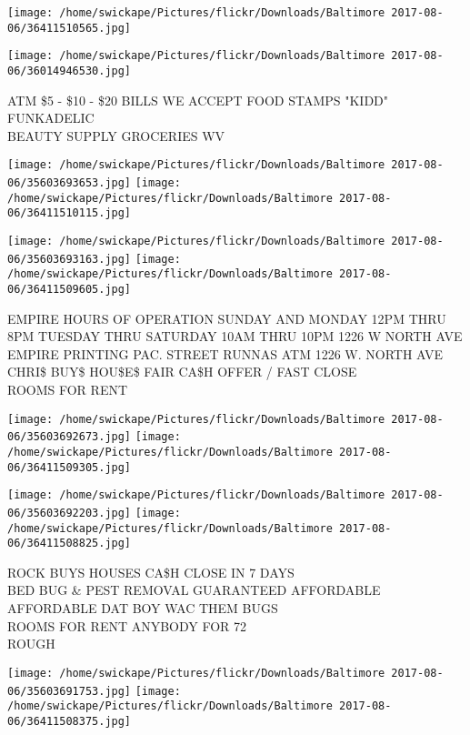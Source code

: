 \documentclass[10pt,letterpaper]{article}
\begin{document}
\texttt{[image: /home/swickape/Pictures/flickr/Downloads/Baltimore 2017-08-06/36411510565.jpg]}

\vspace{0.25in}
\texttt{[image: /home/swickape/Pictures/flickr/Downloads/Baltimore 2017-08-06/36014946530.jpg]}

ATM \$5 {-} \$10 {-} \$20 BILLS WE ACCEPT FOOD STAMPS "KIDD" FUNKADELIC\\
BEAUTY SUPPLY GROCERIES WV\\
\pagebreak

\texttt{[image: /home/swickape/Pictures/flickr/Downloads/Baltimore 2017-08-06/35603693653.jpg]}
\texttt{[image: /home/swickape/Pictures/flickr/Downloads/Baltimore 2017-08-06/36411510115.jpg]}

\texttt{[image: /home/swickape/Pictures/flickr/Downloads/Baltimore 2017-08-06/35603693163.jpg]}
\texttt{[image: /home/swickape/Pictures/flickr/Downloads/Baltimore 2017-08-06/36411509605.jpg]}

EMPIRE HOURS OF OPERATION SUNDAY AND MONDAY 12PM THRU 8PM TUESDAY THRU SATURDAY 10AM THRU 10PM 1226 W NORTH AVE\\
EMPIRE PRINTING PAC. STREET RUNNAS ATM 1226 W. NORTH AVE\\
CHRI\$ BUY\$ HOU\$E\$ FAIR CA\$H OFFER / FAST CLOSE\\
ROOMS FOR RENT\\
\pagebreak

\texttt{[image: /home/swickape/Pictures/flickr/Downloads/Baltimore 2017-08-06/35603692673.jpg]}
\texttt{[image: /home/swickape/Pictures/flickr/Downloads/Baltimore 2017-08-06/36411509305.jpg]}

\texttt{[image: /home/swickape/Pictures/flickr/Downloads/Baltimore 2017-08-06/35603692203.jpg]}
\texttt{[image: /home/swickape/Pictures/flickr/Downloads/Baltimore 2017-08-06/36411508825.jpg]}

ROCK BUYS HOUSES CA\$H CLOSE IN 7 DAYS\\
BED BUG \& PEST REMOVAL GUARANTEED AFFORDABLE AFFORDABLE DAT BOY WAC THEM BUGS\\
ROOMS FOR RENT ANYBODY FOR 72\\
ROUGH\\
\pagebreak

\texttt{[image: /home/swickape/Pictures/flickr/Downloads/Baltimore 2017-08-06/35603691753.jpg]}
\texttt{[image: /home/swickape/Pictures/flickr/Downloads/Baltimore 2017-08-06/36411508375.jpg]}
\end{document}
